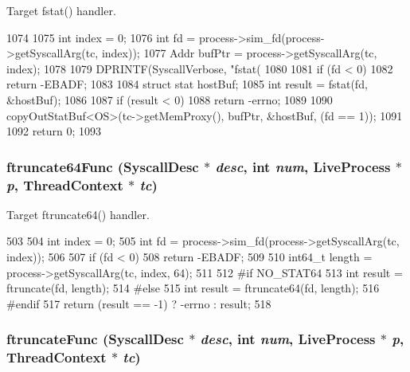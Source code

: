 Target fstat() handler. 


\begin{DoxyCode}
1074 {
1075     int index = 0;
1076     int fd = process->sim_fd(process->getSyscallArg(tc, index));
1077     Addr bufPtr = process->getSyscallArg(tc, index);
1078 
1079     DPRINTF(SyscallVerbose, "fstat(%
1080 
1081     if (fd < 0)
1082         return -EBADF;
1083 
1084     struct stat hostBuf;
1085     int result = fstat(fd, &hostBuf);
1086 
1087     if (result < 0)
1088         return -errno;
1089 
1090     copyOutStatBuf<OS>(tc->getMemProxy(), bufPtr, &hostBuf, (fd == 1));
1091 
1092     return 0;
1093 }
\end{DoxyCode}
\hypertarget{syscall__emul_8hh_ab6f7a64ebc9b0e6b072fe33b42b5015b}{
\subsubsection[{ftruncate64Func}]{ ftruncate64Func ({\bf SyscallDesc} $\ast$ {\em desc}, \/  int {\em num}, \/  {\bf LiveProcess} $\ast$ {\em p}, \/  {\bf ThreadContext} $\ast$ {\em tc})}}
\label{syscall__emul_8hh_ab6f7a64ebc9b0e6b072fe33b42b5015b}


Target ftruncate64() handler. 


\begin{DoxyCode}
503 {
504     int index = 0;
505     int fd = process->sim_fd(process->getSyscallArg(tc, index));
506 
507     if (fd < 0)
508         return -EBADF;
509 
510     int64_t length = process->getSyscallArg(tc, index, 64);
511 
512 #if NO_STAT64
513     int result = ftruncate(fd, length);
514 #else
515     int result = ftruncate64(fd, length);
516 #endif
517     return (result == -1) ? -errno : result;
518 }
\end{DoxyCode}
\hypertarget{syscall__emul_8hh_a895fc73a0e8bb8bbb33b4683a8c5cdf9}{
\subsubsection[{ftruncateFunc}]{ ftruncateFunc ({\bf SyscallDesc} $\ast$ {\em desc}, \/  int {\em num}, \/  {\bf LiveProcess} $\ast$ {\em p}, \/  {\bf ThreadContext} $\ast$ {\em tc})}}
\label{syscall__emul_8hh_a895fc73a0e8bb8bbb33b4683a8c5cdf9}


